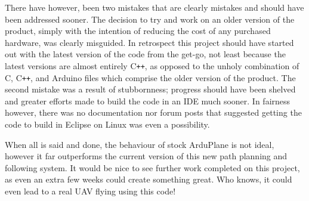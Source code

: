 There have however, been two mistakes that are clearly mistakes and should have been addressed sooner. The decision to try and work on an older version of the product, simply with the intention of reducing the cost of any purchased hardware, was clearly misguided. In retrospect this project should have started out with the latest version of the code from the get-go, not least because the latest versions are almost entirely C\texttt{++}, as opposed to the unholy combination of C, C\texttt{++}, and Arduino files which comprise the older version of the product. The second mistake was a result of stubbornness; progress should have been shelved and greater efforts made to build the code in an IDE much sooner. In fairness however, there was no documentation nor forum posts that suggested getting the code to build in Eclipse on Linux was even a possibility. 

When all is said and done, the behaviour of stock ArduPlane is not ideal, however it far outperforms the current version of this new path planning and following system. It would be nice to see further work completed on this project, as even an extra few weeks could create something great. Who knows, it could even lead to a real UAV flying using this code!
